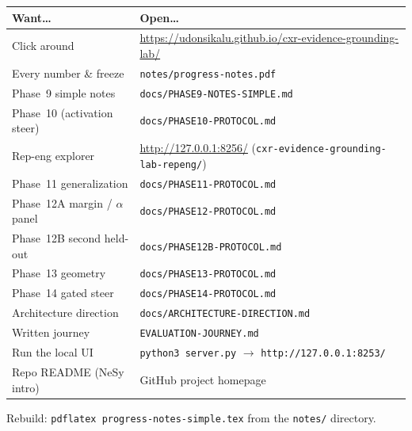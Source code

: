 \documentclass[11pt,a4paper]{article}
\begin{document}
\begin{center}
\begin{tabular}{@{}ll@{}}
\toprule
\textbf{Want\ldots} & \textbf{Open\ldots} \\
\midrule
Click around & \url{https://udonsikalu.github.io/cxr-evidence-grounding-lab/} \\
Every number \& freeze & \texttt{notes/progress-notes.pdf} \\
Phase~9 simple notes & \texttt{docs/PHASE9-NOTES-SIMPLE.md} \\
Phase~10 (activation steer) & \texttt{docs/PHASE10-PROTOCOL.md} \\
Rep-eng explorer & \url{http://127.0.0.1:8256/} (\texttt{cxr-evidence-grounding-lab-repeng/}) \\
Phase~11 generalization & \texttt{docs/PHASE11-PROTOCOL.md} \\
Phase~12A margin / $\alpha$ panel & \texttt{docs/PHASE12-PROTOCOL.md} \\
Phase~12B second held-out & \texttt{docs/PHASE12B-PROTOCOL.md} \\
Phase~13 geometry & \texttt{docs/PHASE13-PROTOCOL.md} \\
Phase~14 gated steer & \texttt{docs/PHASE14-PROTOCOL.md} \\
Architecture direction & \texttt{docs/ARCHITECTURE-DIRECTION.md} \\
Written journey & \texttt{EVALUATION-JOURNEY.md} \\
Run the local UI & \texttt{python3 server.py} $\rightarrow$ \texttt{http://127.0.0.1:8253/} \\
Repo README (NeSy intro) & GitHub project homepage \\
\bottomrule
\end{tabular}
\end{center}

\vspace{1em}
\begin{center}
\color{muted}\small
Rebuild: \texttt{pdflatex progress-notes-simple.tex} from the \texttt{notes/} directory.
\end{center}
\end{document}
